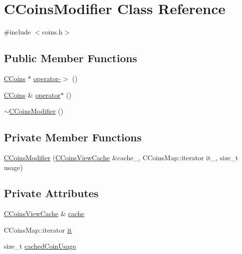 \hypertarget{class_c_coins_modifier}{}\section{C\+Coins\+Modifier Class Reference}
\label{class_c_coins_modifier}


{\ttfamily \#include $<$coins.\+h$>$}

\subsection*{Public Member Functions}
\begin{DoxyCompactItemize}
\item 
\mbox{\hyperlink{class_c_coins}{C\+Coins}} $\ast$ \mbox{\hyperlink{class_c_coins_modifier_a5831f586921460e6ec26635cb92c12f6}{operator-\/$>$}} ()
\item 
\mbox{\hyperlink{class_c_coins}{C\+Coins}} \& \mbox{\hyperlink{class_c_coins_modifier_a403cd7eb708f8c744598ad890bcce1b5}{operator$\ast$}} ()
\item 
\mbox{\hyperlink{class_c_coins_modifier_aacb75869fd2cabec97645eb46f42e98b}{$\sim$\+C\+Coins\+Modifier}} ()
\end{DoxyCompactItemize}
\subsection*{Private Member Functions}
\begin{DoxyCompactItemize}
\item 
\mbox{\hyperlink{class_c_coins_modifier_af4b52a789d194cf57497a36d1e5287d3}{C\+Coins\+Modifier}} (\mbox{\hyperlink{class_c_coins_view_cache}{C\+Coins\+View\+Cache}} \&cache\+\_\+, C\+Coins\+Map\+::iterator it\+\_\+, size\+\_\+t usage)
\end{DoxyCompactItemize}
\subsection*{Private Attributes}
\begin{DoxyCompactItemize}
\item 
\mbox{\hyperlink{class_c_coins_view_cache}{C\+Coins\+View\+Cache}} \& \mbox{\hyperlink{class_c_coins_modifier_a3f01272c4b88d2051e0845fa6282c67b}{cache}}
\item 
C\+Coins\+Map\+::iterator \mbox{\hyperlink{class_c_coins_modifier_a0c524598ef4c00f3eb958946c620683a}{it}}
\item 
size\+\_\+t \mbox{\hyperlink{class_c_coins_modifier_a7b392fa8adb2545b950256c57e04cda2}{cached\+Coin\+Usage}}
\end{DoxyCompactItemize}

